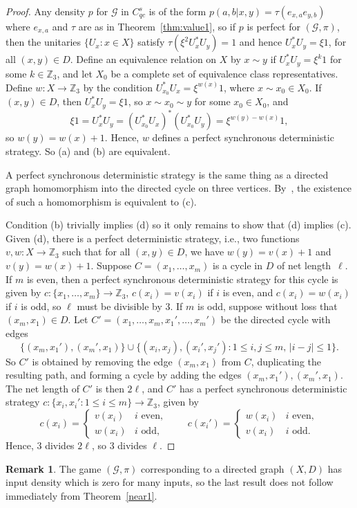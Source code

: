 \documentclass[11pt]{amsart}
\theoremstyle{definition}
\newtheorem{remark}[thm]{Remark}
\newcommand{\bb}[1]{\mathbb{#1}}
\newcommand{\cl}[1]{\mathcal{#1}}
\begin{document}
   \begin{proof}
     Any density $p$ for $\cl G$ in $C_{qc}^s$ is of the form $p(a,b|x,y)=\tau(e_{x,a}e_{y,b})$ where $e_{x,a}$ and $\tau$ are as in Theorem~\ref{thm:value1}, so if $p$ is perfect for $(\cl G,\pi)$, then the unitaries $\{U_x:x\in X\}$ satisfy $\tau(\xi^2U_x^*U_y)=1$ and hence $U_x^*U_y=\xi 1$, for all $(x,y)\in D$.
     Define an equivalence relation on $X$ by $x\sim y$ if $U_x^*U_y=\xi^k1$ for some $k\in \bb Z_3$, and let $X_0$ be a complete set of equivalence class representatives. Define $w:X\to \bb Z_3$ by the condition $U_{x_0}^*U_x=\xi^{w(x)}1$, where $x\sim x_0\in X_0$. If $(x,y)\in D$, then $U_x^*U_y=\xi1$, so $x\sim x_0\sim  y$ for some $x_0\in X_0$, and \[\xi 1=U_x^*U_y=(U_{x_0}^*U_x)^*(U_{x_0}^*U_y)=\xi^{w(y)-w(x)}1,\] so $w(y)=w(x)+1$. Hence, $w$ defines a perfect synchronous deterministic strategy. So (a) and (b) are equivalent.

     A perfect synchronous deterministic strategy is the same thing as a directed graph homomorphism into the directed cycle on three vertices. By~\cite[Theorem~3.2]{BB}, the existence of such a homomorphism is equivalent to (c).

     Condition (b) trivially implies (d) so it only remains to show that (d) implies (c). Given (d), there is a perfect deterministic strategy, i.e., two functions $v,w:X\to \bb Z_3$ such that for all $(x,y)\in D$, we have $w(y)=v(x)+1$ and $v(y)=w(x)+1$. Suppose $C=(x_1,\dots,x_m)$ is a cycle in $D$ of net length~$\ell$. If $m$ is even, then a perfect synchronous deterministic strategy for this cycle is given by $c:\{x_1,\dots,x_m\}\to \bb Z_3$, $c(x_i)=v(x_i)$ if $i$ is even, and $c(x_i)=w(x_i)$ if $i$ is odd, so $\ell$ must be divisible by $3$. If $m$ is odd, suppose without loss that $(x_m,x_1)\in D$. Let $C'=(x_1,\dots,x_m,x_1',\dots,x_m')$ be the directed cycle with edges
     \[ \{ (x_m,x_1'),(x_m',x_1)\}\cup \{ (x_i,x_j),(x_i',x_j'): 1\le
       i,j\le m,\, |i-j|\le 1\}.\] So $C'$ is obtained by removing the edge
     $(x_m,x_1)$ from $C$, duplicating the resulting path, and forming a cycle by adding the edges $(x_m,x_1'),(x_m',x_1)$. The net length of $C'$ is then $2\ell$, and $C'$ has a perfect synchronous deterministic strategy $c:\{x_i,x_i':1\le i\le m\}\to \bb Z_3$, given by
     \[ c(x_i)=
       \begin{cases}
         v(x_i)&\text{$i$ even},\\
         w(x_i)&\text{$i$ odd},
       \end{cases}\qquad
       c(x_i')=
       \begin{cases}
         w(x_i)&\text{$i$ even},\\
         v(x_i)&\text{$i$ odd}.
       \end{cases}\]
     Hence, $3$ divides $2\ell$, so $3$ divides $\ell$.
   \end{proof}
   \begin{remark}
     The game $(\cl G,\pi)$ corresponding to a directed graph $(X,D)$ has input density which is zero for many inputs, so the last result does not follow immediately from Theorem~\ref{near1}.
   \end{remark}
\end{document}
